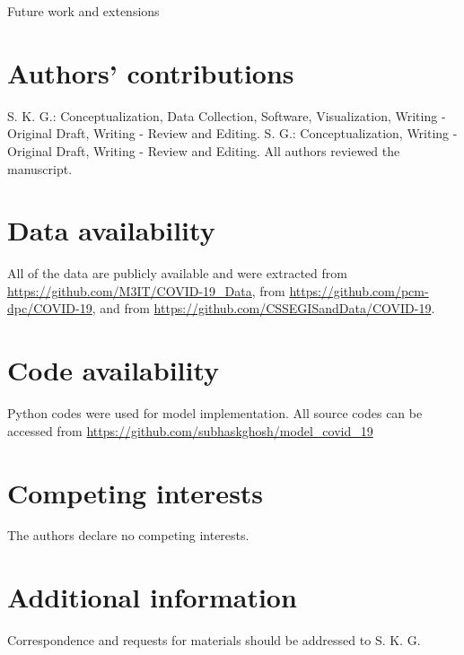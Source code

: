 \documentclass[10pt]{wlscirep}
\begin{document}
Future work and extensions
%
%
\section*{Authors' contributions}
S. K. G.: Conceptualization, Data Collection, Software, Visualization, Writing - Original Draft, Writing - Review and Editing. S. G.: Conceptualization, Writing - Original Draft, Writing - Review and Editing. All authors reviewed the manuscript.

\section*{Data availability}
All of the data are publicly available and were extracted from \url{https://github.com/M3IT/COVID-19_Data}, from  \url{https://github.com/pcm-dpc/COVID-19}, and from \url{https://github.com/CSSEGISandData/COVID-19}.

\section*{Code availability}
Python codes were used for model implementation. All source codes can be accessed from \url{https://github.com/subhaskghosh/model_covid_19}

\section*{Competing interests}
The authors declare no competing interests.

\section*{Additional information}
Correspondence and requests for materials should be addressed to S. K. G.

	
\end{document}
